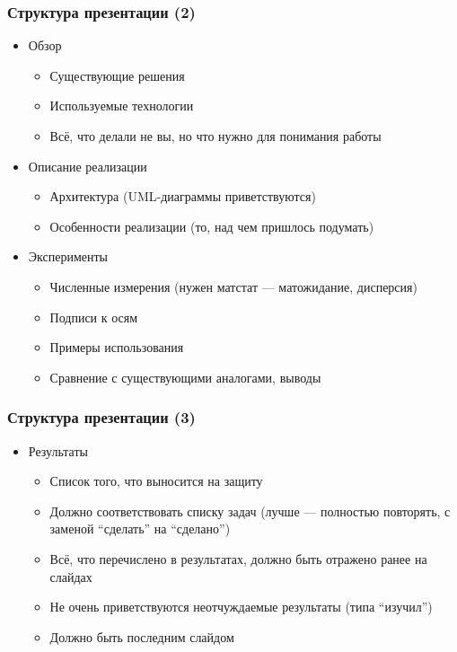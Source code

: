 \documentclass[xetex,mathserif,serif]{beamer}
\begin{document}
    \begin{frame}
        \frametitle{Структура презентации (2)}
        \begin{itemize}
            \item Обзор
            \begin{itemize}
                \item Существующие решения
                \item Используемые технологии
                \item Всё, что делали не вы, но что нужно для понимания работы
            \end{itemize}
            \item Описание реализации
            \begin{itemize}
                \item Архитектура (UML-диаграммы приветствуются)
                \item Особенности реализации (то, над чем пришлось подумать)
            \end{itemize}
            \item Эксперименты
            \begin{itemize}
                \item Численные измерения (нужен матстат --- матожидание, дисперсия)
                \item Подписи к осям
                \item Примеры использования
                \item Сравнение с существующими аналогами, выводы
            \end{itemize}
        \end{itemize}
    \end{frame}

    \begin{frame}
        \frametitle{Структура презентации (3)}
        \begin{itemize}
            \item Результаты
            \begin{itemize}
                \item Список того, что выносится на защиту
                \item Должно соответствовать списку задач (лучше --- полностью повторять, с заменой ``сделать'' на ``сделано'')
                \item Всё, что перечислено в результатах, должно быть отражено ранее на слайдах
                \item Не очень приветствуются неотчуждаемые результаты (типа ``изучил'')
                \item Должно быть последним слайдом
            \end{itemize}
        \end{itemize}
    \end{frame}
\end{document}

